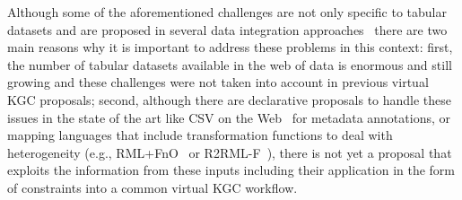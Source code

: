 Although some of the aforementioned challenges are not only specific to tabular datasets and are proposed in several data integration approaches~\citep{golshan2017data,halevy2006data,doan2012principles} there are two main reasons why it is important to address these problems in this context: first, the number of tabular datasets available in the web of data is enormous and still growing and these challenges were not taken into account in previous virtual KGC proposals; second, although there are declarative proposals to handle these issues in the state of the art like CSV on the Web~\citep{tennison2015model} for metadata annotations, or mapping languages that include transformation functions to deal with heterogeneity (e.g., RML+FnO~\citep{de2017declarative} or R2RML-F~\citep{debruyne2016r2rml}), there is not yet a proposal that exploits the information from these inputs including their application in the form of constraints into a common virtual KGC workflow.



